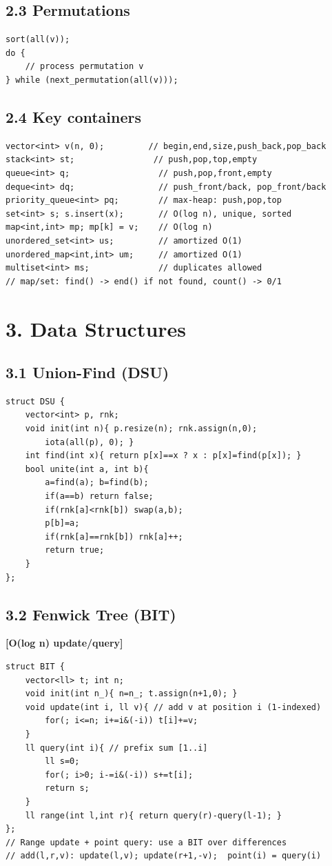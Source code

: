 \documentclass[11pt]{extarticle}
\newcommand{\comp}[1]{\textbf{[#1]}\\}
\begin{document}
\subsection*{2.3 Permutations}
\begin{lstlisting}
sort(all(v));
do {
    // process permutation v
} while (next_permutation(all(v)));
\end{lstlisting}

\subsection*{2.4 Key containers}
\begin{lstlisting}
vector<int> v(n, 0);         // begin,end,size,push_back,pop_back
stack<int> st;                // push,pop,top,empty
queue<int> q;                  // push,pop,front,empty
deque<int> dq;                 // push_front/back, pop_front/back
priority_queue<int> pq;        // max-heap: push,pop,top
set<int> s; s.insert(x);       // O(log n), unique, sorted
map<int,int> mp; mp[k] = v;    // O(log n)
unordered_set<int> us;         // amortized O(1)
unordered_map<int,int> um;     // amortized O(1)
multiset<int> ms;              // duplicates allowed
// map/set: find() -> end() if not found, count() -> 0/1
\end{lstlisting}

\section*{3. Data Structures}
\subsection*{3.1 Union-Find (DSU)}
\begin{lstlisting}
struct DSU {
    vector<int> p, rnk;
    void init(int n){ p.resize(n); rnk.assign(n,0);
        iota(all(p), 0); }
    int find(int x){ return p[x]==x ? x : p[x]=find(p[x]); }
    bool unite(int a, int b){
        a=find(a); b=find(b);
        if(a==b) return false;
        if(rnk[a]<rnk[b]) swap(a,b);
        p[b]=a;
        if(rnk[a]==rnk[b]) rnk[a]++;
        return true;
    }
};
\end{lstlisting}

\subsection*{3.2 Fenwick Tree (BIT)}
\comp{O(log n) update/query}
\begin{lstlisting}
struct BIT {
    vector<ll> t; int n;
    void init(int n_){ n=n_; t.assign(n+1,0); }
    void update(int i, ll v){ // add v at position i (1-indexed)
        for(; i<=n; i+=i&(-i)) t[i]+=v;
    }
    ll query(int i){ // prefix sum [1..i]
        ll s=0;
        for(; i>0; i-=i&(-i)) s+=t[i];
        return s;
    }
    ll range(int l,int r){ return query(r)-query(l-1); }
};
// Range update + point query: use a BIT over differences
// add(l,r,v): update(l,v); update(r+1,-v);  point(i) = query(i)
\end{lstlisting}
\end{document}
